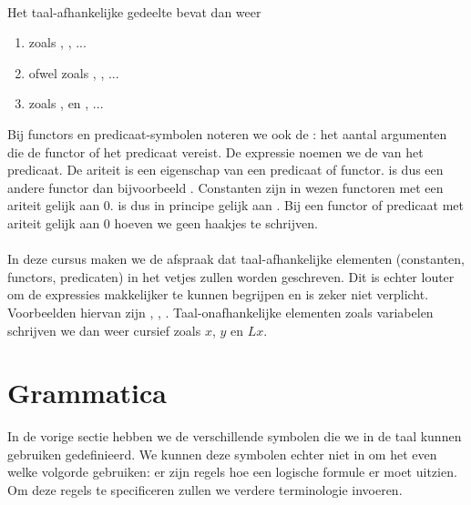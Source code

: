 \paragraph{}
Het taal-afhankelijke gedeelte bevat dan weer
\begin{enumerate}
 \item {} zoals , , ...
 \item {} ofwel  zoals , , ...
 \item {} zoals ,  en , ...
\end{enumerate}
Bij functors en predicaat-symbolen noteren we ook de : het aantal argumenten die de functor of het predicaat vereist. De expressie  noemen we de  van het predicaat. De ariteit is een eigenschap van een predicaat of functor.  is dus een andere functor dan bijvoorbeeld . Constanten zijn in wezen functoren met een ariteit gelijk aan 0.  is dus in principe gelijk aan . Bij een functor of predicaat met ariteit gelijk aan 0 hoeven we geen haakjes te schrijven.
\paragraph{}
In deze cursus maken we de afspraak dat taal-afhankelijke elementen (constanten, functors, predicaten) in het vetjes zullen worden geschreven. Dit is echter louter om de expressies makkelijker te kunnen begrijpen en is zeker niet verplicht. Voorbeelden hiervan zijn , , . Taal-onafhankelijke elementen zoals variabelen schrijven we dan weer cursief zoals $x$, $y$ en $Lx$.
\section{Grammatica}
In de vorige sectie hebben we de verschillende symbolen die we in de taal kunnen gebruiken gedefinieerd. We kunnen deze symbolen echter niet in om het even welke volgorde gebruiken: er zijn regels hoe een logische formule er moet uitzien. Om deze regels te specificeren zullen we verdere terminologie invoeren.
